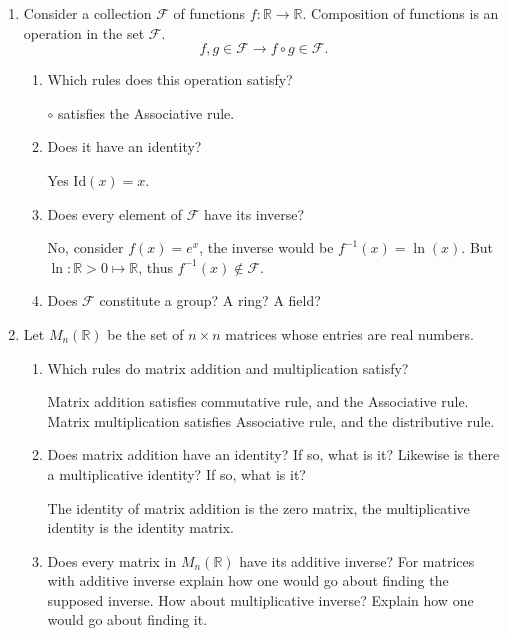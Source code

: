 \documentclass[10pt]{amsart}
\begin{document}
\begin{enumerate}
  \item Consider a collection $\mathcal{F}$ of functions
    $f:\mathbb{R}\rightarrow\mathbb{R}$. Composition of functions is an
    operation in the set $\mathcal{F}$.  \[f,g\in\mathcal{F}\rightarrow f\circ
    g\in\mathcal{F}.\]
    \begin{enumerate}[listparindent=0.7cm]
      \item Which rules does this operation satisfy?

        $\circ$ satisfies the Associative rule.
      \item Does it have an identity?

        Yes $\text{Id}(x)=x$.
      \item Does every element of $\mathcal{F}$ have its inverse?

        No, consider $f(x)=e^x$, the inverse would be $f^{-1}(x)=\ln(x)$. But
        $\ln: \mathbb{R} > 0 \mapsto \mathbb{R}$, thus
        $f^{-1}(x)\notin\mathcal{F}$.
      \item Does $\mathcal{F}$ constitute a group? A ring? A field?
    \end{enumerate}
  \item Let $M_n(\mathbb{R})$ be the set of $n\times n$ matrices whose entries
    are real numbers.
    \begin{enumerate}[listparindent=0.7cm]
      \item Which rules do matrix addition and multiplication satisfy?

        Matrix addition satisfies commutative rule, and the Associative rule.
        Matrix multiplication satisfies Associative rule, and the distributive
        rule.
      \item Does matrix addition have an identity? If so, what is it? Likewise
        is there a multiplicative identity? If so, what is it?

        The identity of matrix addition is the zero matrix, the multiplicative
        identity is the identity matrix.
      \item Does every matrix in $M_n(\mathbb{R})$ have its additive inverse?
        For matrices with additive inverse explain how one would go about
        finding the supposed inverse. How about multiplicative inverse? Explain
        how one would go about finding it.


\end{enumerate}
\end{enumerate}
\end{document}
